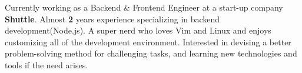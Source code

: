 \par{
Currently working as a Backend \& Frontend Engineer at a start-up company \textbf{Shuttle}. Almost \textbf{2} years experience specializing in backend development(Node.js). A super nerd who loves Vim and Linux and enjoys customizing all of the development environment.
Interested in devising a better problem-solving method for challenging tasks, and learning new technologies and tools if the need arises.
\newline
}